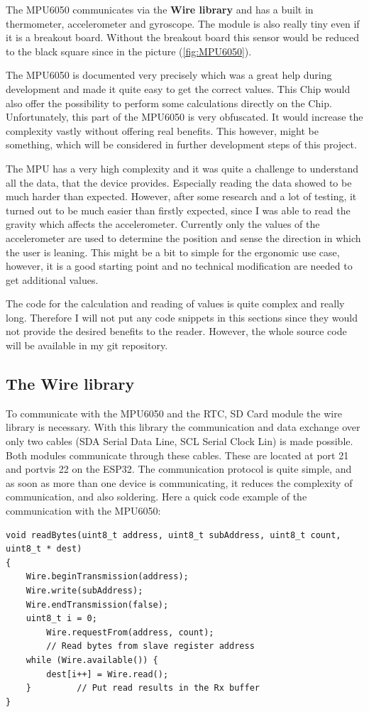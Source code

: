 The MPU6050 communicates via the \textbf{Wire library} and has a built in thermometer, accelerometer and gyroscope. The module is also really tiny even if it is a breakout board.
Without the breakout board this sensor would be reduced to the black square since in the picture (\ref{fig:MPU6050}).

The MPU6050 is documented very precisely which was a great help during development and made it quite easy to get the correct values. This Chip would also offer the possibility to perform some calculations directly on the Chip. Unfortunately, this part of the MPU6050 is very obfuscated. It would increase the complexity vastly without offering real benefits. This however, might be something, which will be considered in further development steps of this project.

The MPU has a very high complexity and it was quite a challenge to understand all the data, that the device provides. Especially reading the data showed to be much harder than expected. However, after some research and a lot of testing, it turned out to be much easier than firstly expected, since I was able to read the gravity which affects the accelerometer.
Currently only the values of the accelerometer are used to determine the position and sense the direction in which the user is leaning. This might be a bit to simple for the ergonomic use case, however, it is a good starting point and no technical modification are needed to get additional values.

The code for the calculation and reading of values is quite complex and really long. Therefore I will not put any code snippets in this sections since they would not provide the desired benefits to the reader. However, the whole source code will be available in my git repository. \cite{GF3RGabr46:online} \cite{TDKAttra32:online}

\newpage

\subsection{The Wire library}

To communicate with the MPU6050 and the RTC, SD Card module the wire library is necessary. With this library the communication and data exchange over only two cables (SDA Serial Data Line, SCL Serial Clock Lin) is made possible. Both modules communicate through these cables. These are located at port 21 and portvis 22 on the ESP32. The communication protocol is quite simple, and as soon as more than one device is communicating, it reduces the complexity of communication, and also soldering. Here a quick code example of the communication with the MPU6050:
\begin{lstlisting}
void readBytes(uint8_t address, uint8_t subAddress, uint8_t count, uint8_t * dest)
{  
	Wire.beginTransmission(address);   
	Wire.write(subAddress);            
	Wire.endTransmission(false);       
	uint8_t i = 0;
        Wire.requestFrom(address, count);  
        // Read bytes from slave register address 
	while (Wire.available()) {
        dest[i++] = Wire.read(); 
    }         // Put read results in the Rx buffer
}
\end{lstlisting}
\cite{MPU9250M94:online}


